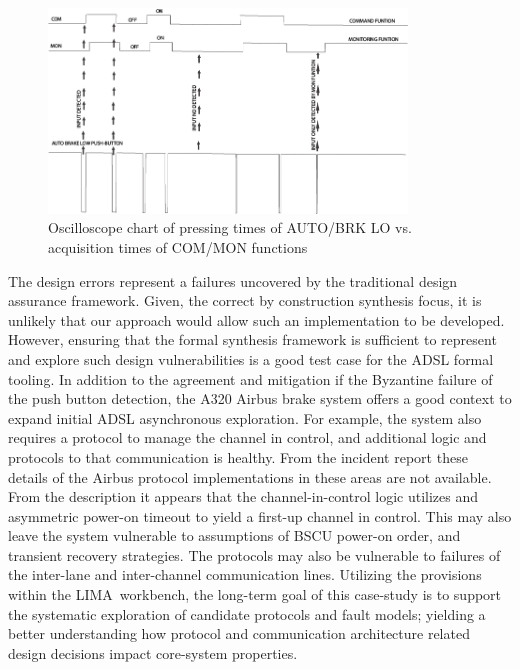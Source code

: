 \begin{figure}
\begin{center}
\includegraphics[width=0.85\textwidth]{figures/newtrace.jpg}
\caption{Oscilloscope chart of pressing times of AUTO/BRK LO vs. acquisition times of COM/MON functions}
\label{fig:push_button_sampling}
\end{center}
\end{figure}

 The design errors represent a failures uncovered by the traditional design assurance
 framework.  Given, the correct by construction synthesis focus, it is unlikely
 that our approach would allow such an implementation to be developed.  However,
 ensuring that the formal synthesis framework is sufficient to represent and
 explore such design vulnerabilities is a good test case for the ADSL formal
 tooling.  In addition to the agreement and mitigation if the Byzantine failure
 of the push button detection, the A320 Airbus brake system offers a good context
 to expand initial ADSL asynchronous exploration. For example, the system also
 requires a protocol to manage the channel in control, and additional logic and
 protocols to that communication is healthy.  From the incident report these
 details of the Airbus protocol implementations in these areas are not
 available. From the description it appears that the channel-in-control logic
 utilizes and asymmetric power-on timeout to yield a first-up channel in
 control. This may also leave the system vulnerable to assumptions of BSCU
 power-on order, and transient recovery strategies.  The protocols may also be
 vulnerable to failures of the inter-lane and inter-channel communication lines.
  Utilizing the provisions within the LIMA\ workbench, the long-term goal
of this case-study is to support the systematic exploration of candidate
protocols and fault models; yielding a better understanding how protocol
and communication architecture related design decisions impact core-system
properties.
